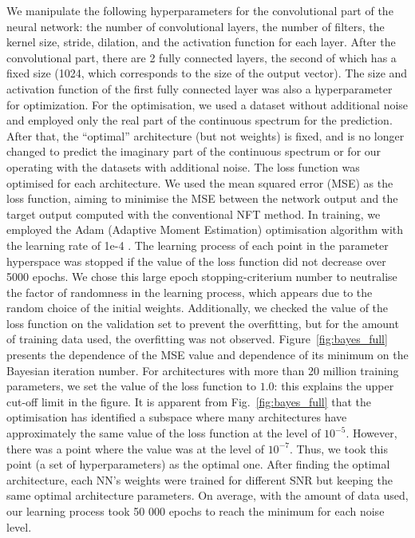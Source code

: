 We manipulate the following hyperparameters for the convolutional part of the neural network: the number of convolutional layers, the number of filters, the kernel size, stride, dilation, and the activation function for each layer. After the convolutional part, there are 2 fully connected layers, the second of which has a fixed size (1024, which corresponds to the size of the output vector). The size and activation function of the first fully connected layer was also a hyperparameter for optimization.
For the optimisation, we used a dataset without additional noise and employed only the real part of the continuous spectrum for the prediction. After that, the ``optimal'' architecture (but not weights) is fixed, and is no longer changed to predict the imaginary part of the continuous spectrum or for our operating with the datasets with additional noise.
The loss function was optimised for each architecture. We used the mean squared error (MSE) as the loss function, aiming to minimise the MSE between the network output and the target output computed with the conventional NFT method\cite{FNFT2018}. In training, we employed the Adam (Adaptive Moment Estimation) optimisation algorithm with the learning rate of 1e-4 \cite{s2000adaptive}. 
The learning process of each point in the parameter hyperspace was stopped if the value of the loss function did not decrease over 5000 epochs. 
We chose this large epoch stopping-criterium number to neutralise the factor of randomness in the learning process, which appears due to the random choice of the initial weights. Additionally, we checked the value of the loss function on the validation set to prevent the overfitting, but for the amount of training data used, the overfitting was not observed. 
Figure~\ref{fig:bayes_full} presents the dependence of the MSE value and dependence of its minimum on the  Bayesian iteration number. For architectures with more than 20 million training parameters, we set the value of the loss function to $1.0$: this explains the upper cut-off limit in the figure. It is apparent from Fig.~\ref{fig:bayes_full} that the optimisation has identified a subspace where many architectures have approximately the same value of the loss function at the level of $10^{-5}$. However, there was a point where the value was at the level of $10^{-7}$. Thus, we took this point (a set of hyperparameters) as the optimal one.
After finding the optimal architecture, each NN's weights were trained for different SNR but keeping the same optimal architecture parameters. On average, with the amount of data used, our learning process took 50 000 epochs to reach the minimum for each noise level.


